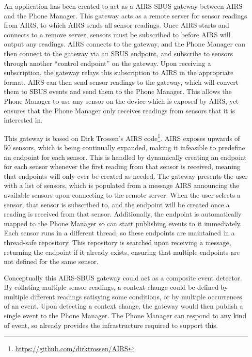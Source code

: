 \documentclass[12pt,twoside,notitlepage]{report}
\begin{document}
An application has been created to act as a AIRS-SBUS gateway between AIRS and the Phone Manager. 
This gateway acts as a remote server for sensor readings from AIRS, to which AIRS sends all sensor readings. 
Once AIRS starts and connects to a remove server, sensors must be subscribed to before AIRS will output any readings. 
AIRS connects to the gateway, and the Phone Manager can then connect to the gateway via an SBUS endpoint, and subscribe to sensors through another ``control endpoint'' on the gateway. 
Upon receiving a subscription, the gateway relays this subscription to AIRS in the appropriate format. 
AIRS can then send sensor readings to the gateway, which will convert them to SBUS events and send them to the Phone Manager. 
This allows the Phone Manager to use any sensor on the device which is exposed by AIRS, yet ensures that the Phone Manager only receives readings from sensors that it is interested in. 
 
This gateway is based on Dirk Trossen's AIRS code\footnote{\url{https://github.com/dirktrossen/AIRS}}. 
AIRS exposes upwards of 50 sensors, which is being continually expanded, making it infeasible to predefine an endpoint for each sensor. 
This is handled by dynamically creating an endpoint for each sensor whenever the first reading from that sensor is received, meaning that endpoints will only ever be created as needed. 
The gateway presents the user with a list of sensors, which is populated from a message AIRS announcing the available sensors upon connecting to the remote server. 
When the user selects a sensor, that sensor is subscribed to, and the endpoint will be created once a reading is received from that sensor. 
Additionally, the endpoint is automatically mapped to the Phone Manager so can start publishing events to it immediately. 
Each sensor runs in a different thread, so these endpoints are maintained in a thread-safe repository. 
This repository is searched upon receiving a message, returning the endpoint if it already exists, ensuring that multiple endpoints are not defined for the same sensor. 

Conceptually this AIRS-SBUS gateway could act as a composite event detector. 
By collating multiple sensor readings, a context change could be defined by multiple different readings satisying some conditions, or by multiple occurrences of an event.
Upon detecting a context change, the gateway would then publish a single event to the Phone Manager. 
The Phone Manager can respond to any kind of event, so already provides the infrastructure required to support this.
\end{document}
